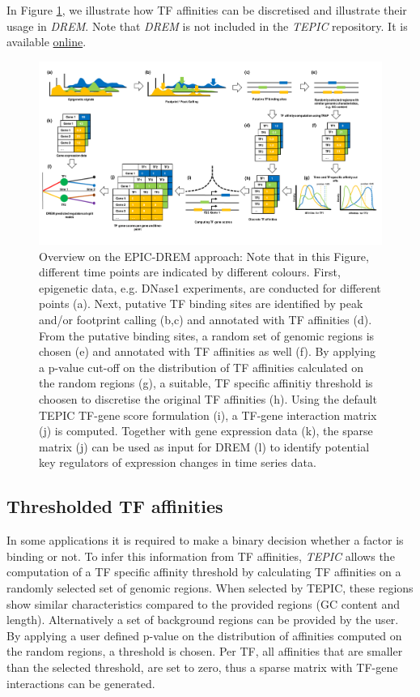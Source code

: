 \documentclass{article}
\begin{document}
In Figure \ref{epicdrem}, we illustrate how TF affinities can be discretised and illustrate their usage in \textit{DREM}. Note that \textit{DREM}
is not included in the \textit{TEPIC} repository. It is available \href{http://www.sb.cs.cmu.edu/drem/}{online}.
\begin{figure}[h!]
\begin{center}
\includegraphics[width=\textwidth]{epicdrem.pdf}
\end{center}
\caption{Overview on the EPIC-DREM approach: Note that in this Figure, different time points are indicated by different colours. First, epigenetic data, e.g. DNase1 experiments, are conducted for different points (a).
Next, putative TF binding sites are identified by peak and/or footprint calling (b,c) and annotated with TF affinities (d). 
From the putative binding sites, a random set of genomic regions is chosen (e) and annotated with TF affinities as well (f). By applying a p-value cut-off on the distribution of TF affinities calculated on the random regions (g),
a suitable, TF specific affinitiy threshold is choosen to discretise the original TF affinities (h). Using the default TEPIC TF-gene score formulation (i), a TF-gene interaction matrix (j) is computed. Together with gene expression data (k),
the sparse matrix (j) can be used as input for DREM (l) to identify potential key regulators of expression changes in time series data.}
\label{epicdrem}
\end{figure}

\subsection{Thresholded TF affinities}
In some applications it is required to make a binary decision whether a factor is binding or not. 
To infer this information from TF affinities, \textit{TEPIC} allows the computation of a TF specific affinity threshold by calculating TF affinities on a randomly selected set of genomic regions. When selected by TEPIC, these regions show similar characteristics compared to the provided regions (GC content and length). 
Alternatively a set of background regions can be provided by the user.
By applying a user defined p-value on the distribution of affinities computed on the random regions, a threshold is chosen. 
Per TF, all affinities that are smaller than the selected threshold, are set to zero, thus a sparse matrix with TF-gene interactions can be generated. 
\end{document}
